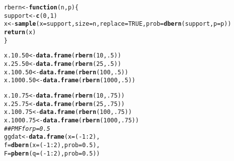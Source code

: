 \documentclass{article}\usepackage[]{graphicx}\usepackage[]{color}
\makeatletter
\newcommand{\hlnum}[1]{\textcolor[rgb]{0.686,0.059,0.569}{#1}}%
\newcommand{\hlcom}[1]{\textcolor[rgb]{0.678,0.584,0.686}{\textit{#1}}}%
\newcommand{\hlopt}[1]{\textcolor[rgb]{0,0,0}{#1}}%
\newcommand{\hlstd}[1]{\textcolor[rgb]{0.345,0.345,0.345}{#1}}%
\newcommand{\hlkwa}[1]{\textcolor[rgb]{0.161,0.373,0.58}{\textbf{#1}}}%
\newcommand{\hlkwb}[1]{\textcolor[rgb]{0.69,0.353,0.396}{#1}}%
\newcommand{\hlkwc}[1]{\textcolor[rgb]{0.333,0.667,0.333}{#1}}%
\newcommand{\hlkwd}[1]{\textcolor[rgb]{0.737,0.353,0.396}{\textbf{#1}}}%
\newenvironment{kframe}{%
 \def\at@end@of@kframe{}%
 \ifinner\ifhmode%
  \def\at@end@of@kframe{\end{minipage}}%
  \begin{minipage}{\columnwidth}%
 \fi\fi%
 \def\FrameCommand##1{\hskip\@totalleftmargin \hskip-\fboxsep
 \colorbox{shadecolor}{##1}\hskip-\fboxsep
     \hskip-\linewidth \hskip-\@totalleftmargin \hskip\columnwidth}%
 \MakeFramed {\advance\hsize-\width
   \@totalleftmargin\z@ \linewidth\hsize
   \@setminipage}}%
 {\par\unskip\endMakeFramed%
 \at@end@of@kframe}
\newenvironment{knitrout}{}{} %
\makeatother
\begin{document}
\begin{enumerate}
\begin{knitrout}
\begin{kframe}
\begin{alltt}
\hlstd{rbern}\hlkwb{<-}\hlkwa{function}\hlstd{(}\hlkwc{n}\hlstd{,}\hlkwc{p}\hlstd{)\{}
  \hlstd{support}\hlkwb{<-}\hlkwd{c}\hlstd{(}\hlnum{0}\hlstd{,}\hlnum{1}\hlstd{)}
  \hlstd{x}\hlkwb{<-}\hlkwd{sample}\hlstd{(}\hlkwc{x}\hlstd{=support,} \hlkwc{size}\hlstd{=n,} \hlkwc{replace}\hlstd{=}\hlnum{TRUE}\hlstd{,} \hlkwc{prob}\hlstd{=}\hlkwd{dbern}\hlstd{(support,} \hlkwc{p}\hlstd{=p))}
  \hlkwd{return}\hlstd{(x)}
\hlstd{\}}

\hlstd{x.10.50}   \hlkwb{<-}\hlkwd{data.frame}\hlstd{(}\hlkwd{rbern}\hlstd{(}\hlnum{10}\hlstd{,} \hlnum{.5}\hlstd{))}
\hlstd{x.25.50}   \hlkwb{<-}\hlkwd{data.frame}\hlstd{(}\hlkwd{rbern}\hlstd{(}\hlnum{25}\hlstd{,} \hlnum{.5}\hlstd{))}
\hlstd{x.100.50}  \hlkwb{<-}\hlkwd{data.frame}\hlstd{(}\hlkwd{rbern}\hlstd{(}\hlnum{100}\hlstd{,} \hlnum{.5}\hlstd{))}
\hlstd{x.1000.50} \hlkwb{<-}\hlkwd{data.frame}\hlstd{(}\hlkwd{rbern}\hlstd{(}\hlnum{1000}\hlstd{,} \hlnum{.5}\hlstd{))}

\hlstd{x.10.75}   \hlkwb{<-}\hlkwd{data.frame}\hlstd{(}\hlkwd{rbern}\hlstd{(}\hlnum{10}\hlstd{,} \hlnum{.75}\hlstd{))}
\hlstd{x.25.75}   \hlkwb{<-}\hlkwd{data.frame}\hlstd{(}\hlkwd{rbern}\hlstd{(}\hlnum{25}\hlstd{,} \hlnum{.75}\hlstd{))}
\hlstd{x.100.75}  \hlkwb{<-}\hlkwd{data.frame}\hlstd{(}\hlkwd{rbern}\hlstd{(}\hlnum{100}\hlstd{,} \hlnum{.75}\hlstd{))}
\hlstd{x.1000.75} \hlkwb{<-}\hlkwd{data.frame}\hlstd{(}\hlkwd{rbern}\hlstd{(}\hlnum{1000}\hlstd{,} \hlnum{.75}\hlstd{))}
\hlcom{## PMF for p=0.5 }
\hlstd{ggdat} \hlkwb{<-} \hlkwd{data.frame}\hlstd{(}\hlkwc{x} \hlstd{= (}\hlopt{-}\hlnum{1}\hlopt{:}\hlnum{2}\hlstd{),}
                      \hlkwc{f} \hlstd{=} \hlkwd{dbern}\hlstd{(}\hlkwc{x} \hlstd{= (}\hlopt{-}\hlnum{1}\hlopt{:}\hlnum{2}\hlstd{),} \hlkwc{prob} \hlstd{=} \hlnum{0.5}\hlstd{),}
                      \hlkwc{F} \hlstd{=} \hlkwd{pbern}\hlstd{(}\hlkwc{q} \hlstd{= (}\hlopt{-}\hlnum{1}\hlopt{:}\hlnum{2}\hlstd{),} \hlkwc{prob} \hlstd{=} \hlnum{0.5}\hlstd{))}


\end{alltt}
\end{kframe}
\end{knitrout}
\end{enumerate}
\end{document}

